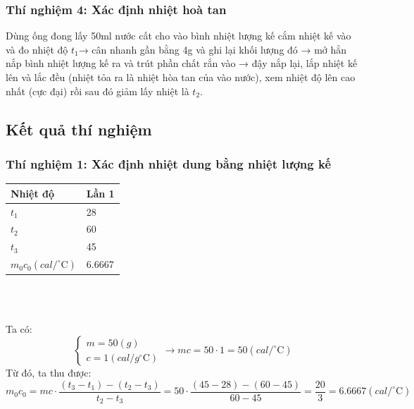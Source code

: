 \documentclass[12pt]{article}
\begin{document}
\subsubsection{Thí nghiệm 4: Xác định nhiệt hoà tan }
Dùng ống đong lấy 50ml nước cất cho vào bình nhiệt lượng kế cắm nhiệt kế
vào và đo nhiệt độ $t_1$→ cân nhanh gần bằng 4g  và ghi lại khối lượng đó
→ mở hẳn nắp bình nhiệt lượng kế ra và trút phần chất rắn vào → đậy nắp lại, lắp nhiệt kế lên và lắc đều (nhiệt tỏa ra là nhiệt hòa tan của  vào nước), xem nhiệt độ lên cao nhất (cực đại) rồi sau đó giảm lấy nhiệt là $t_2$.
\newpage
\subsection{Kết quả thí nghiệm}
\subsubsection{Thí nghiệm 1: Xác định nhiệt dung bằng nhiệt lượng kế}
{\centering \begin{tabular}{|m{3cm}|m{3cm}|}
\hline
Nhiệt độ  & Lần 1  \\ \hline
$t_1$ & 28   \\ \hline
$t_2$& 60   \\ \hline
$t_3$ & 45  \\ \hline
$m_0c_0 (cal/^\circ\mathrm{C}) $ & 6.6667 \\ \hline
\end{tabular} \\} \\
Ta có:
\[
\begin{cases}
m  = 50(g)\\
c =  1 (cal/g^\circ\mathrm{C})
\end{cases} 
\rightarrow mc = 50 \cdot 1  = 50 (cal/^\circ\mathrm{C})
\]
Từ đó, ta thu được:
\[
m_0c_0 = mc \cdot \frac{(t_3 -t_1) - (t_2 - t_3)}{t_2 - t_3} =  50 \cdot \frac{(45-28) - (60 -45)}{60 -45} = \frac{20}{3}= 6.6667 (cal/^\circ\mathrm{C})
\] 
\end{document}
